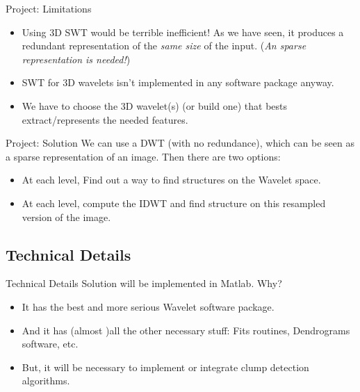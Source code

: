 \documentclass{beamer}
\begin{document}
\begin{frame}{Project: Limitations}
\begin{itemize}
  \item Using 3D SWT would be terrible inefficient! As we have seen, it produces a redundant
  representation of the \textit{same size} of the input. (\textit{An sparse representation
  is needed!})
  \item SWT for 3D wavelets isn't implemented in any software package anyway.
  \item We have to choose the 3D wavelet(s) (or build one) that bests extract/represents
  the needed features.  
\end{itemize}
\end{frame}

\begin{frame}{Project: Solution}
We can use a DWT (with no redundance), which can be seen as a sparse representation
of an image. Then there are two options:
\begin{itemize}
  \item At each level, Find out a way to find structures on the Wavelet space.
  \item At each level, compute the IDWT and find structure on this resampled version
  of the image.
\end{itemize}
\end{frame}


\subsection{Technical Details}
\begin{frame}{Technical Details}
Solution will be implemented in Matlab. Why?
\begin{itemize}
  \item It has the best and more serious Wavelet software package.
  \item And it has (almost )all the other necessary stuff: Fits routines,
  Dendrograms software, etc.
  \item But, it will be necessary to implement or integrate clump detection
  algorithms.
\end{itemize} 
\end{frame}
\end{document}
